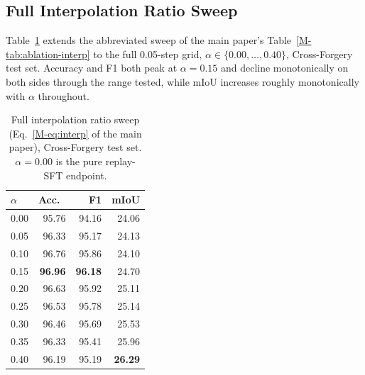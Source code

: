 \documentclass[10pt,twocolumn,letterpaper]{article}
\begin{document}
\subsection{Full Interpolation Ratio Sweep}
Table~\ref{tab:ablation-interp-full} extends the abbreviated sweep of the main paper's Table~\ref{M-tab:ablation-interp} to the full 0.05-step grid, $\alpha \in \{0.00, \ldots, 0.40\}$, Cross-Forgery test set. Accuracy and F1 both peak at $\alpha{=}0.15$ and decline monotonically on both sides through the range tested, while mIoU increases roughly monotonically with $\alpha$ throughout.

\begin{table}[h]
\centering
\small
\caption{Full interpolation ratio sweep (Eq.~\ref{M-eq:interp} of the main paper), Cross-Forgery test set. $\alpha{=}0.00$ is the pure replay-SFT endpoint.}
\label{tab:ablation-interp-full}
\begin{tabular}{lrrr}
\toprule
$\alpha$ & Acc.\ & F1 & mIoU \\
\midrule
0.00 & 95.76 & 94.16 & 24.06 \\
0.05 & 96.33 & 95.17 & 24.13 \\
0.10 & 96.76 & 95.86 & 24.10 \\
0.15 & \textbf{96.96} & \textbf{96.18} & 24.70 \\
0.20 & 96.63 & 95.92 & 25.11 \\
0.25 & 96.53 & 95.78 & 25.14 \\
0.30 & 96.46 & 95.69 & 25.53 \\
0.35 & 96.33 & 95.41 & 25.96 \\
0.40 & 96.19 & 95.19 & \textbf{26.29} \\
\bottomrule
\end{tabular}
\end{table}
\end{document}
